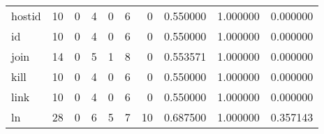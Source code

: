 \begin{tabular}{lrrrrrrrrr}
hostid    &                                       10 &                                                  0 &                                                  4 &                                                  0 &                                                  6 &                                                  0 &                                           0.550000 &                               1.000000 &                             0.000000 \\
id        &                                       10 &                                                  0 &                                                  4 &                                                  0 &                                                  6 &                                                  0 &                                           0.550000 &                               1.000000 &                             0.000000 \\
join      &                                       14 &                                                  0 &                                                  5 &                                                  1 &                                                  8 &                                                  0 &                                           0.553571 &                               1.000000 &                             0.000000 \\
kill      &                                       10 &                                                  0 &                                                  4 &                                                  0 &                                                  6 &                                                  0 &                                           0.550000 &                               1.000000 &                             0.000000 \\
link      &                                       10 &                                                  0 &                                                  4 &                                                  0 &                                                  6 &                                                  0 &                                           0.550000 &                               1.000000 &                             0.000000 \\
ln        &                                       28 &                                                  0 &                                                  6 &                                                  5 &                                                  7 &                                                 10 &                                           0.687500 &                               1.000000 &                             0.357143 \\

\end{tabular}
